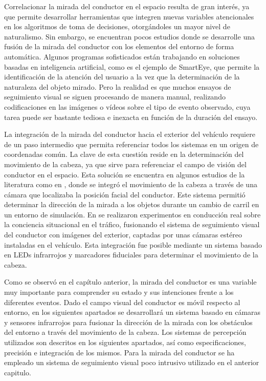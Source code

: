 Correlacionar la mirada del conductor en el espacio resulta de gran interés, ya que permite desarrollar herramientas que integren nuevas variables atencionales en los algoritmos de toma de decisiones, otorgándoles un mayor nivel de naturalismo. Sin embargo, se encuentran pocos estudios donde se desarrolle una fusión de la mirada del conductor con los elementos del entorno de forma automática. Algunos programas sofisticados están trabajando en soluciones basadas en inteligencia artificial, como es el ejemplo de SmartEye, que permite la identificación de la atención del usuario a la vez que la determinación de la naturaleza del objeto mirado. Pero la realidad es que muchos ensayos de seguimiento visual se siguen procesando de manera manual, realizando codificaciones en las imágenes o vídeos sobre el tipo de evento observado, cuya tarea puede ser bastante tediosa e inexacta en función de la duración del ensayo.

La integración de la mirada del conductor hacia el exterior del vehículo requiere de un paso intermedio que permita referenciar todos los sistemas en un origen de coordenadas común. La clave de esta cuestión reside en la determinación del movimiento de la cabeza, ya que sirve para referenciar el campo de visión del conductor en el espacio. Esta solución se encuentra en algunos estudios de la literatura como en \textcite{deng}, donde se integró el movimiento de la cabeza a través de una cámara que localizaba la posición facial del conductor. Este sistema permitió determinar la dirección de la mirada a los objetos durante un cambio de carril en un entorno de simulación. En \textcite{langner} se realizaron experimentos en conducción real sobre la conciencia situacional en el tráfico, fusionando el sistema de seguimiento visual del conductor con imágenes del exterior, captadas por unas cámaras estéreo instaladas en el vehículo. Esta integración fue posible mediante un sistema basado en LEDs infrarrojos y marcadores fiduciales para determinar el movimiento de la cabeza.

Como se observó en el capítulo anterior, la mirada del conductor es una variable muy importante para comprender su estado y sus intenciones frente a los diferentes eventos. Dado el campo visual del conductor es móvil respecto al entorno, en los siguientes apartados se desarrollará un sistema basado en cámaras y sensores infrarrojos para fusionar la dirección de la mirada con los obstáculos del entorno a través del movimiento de la cabeza. Los sistemas de percepción utilizados son descritos en los siguientes apartados, así como especificaciones, precisión e integración de los mismos. Para la mirada del conductor se ha empleado un sistema de seguimiento visual poco intrusivo utilizado en el anterior capitulo. 

